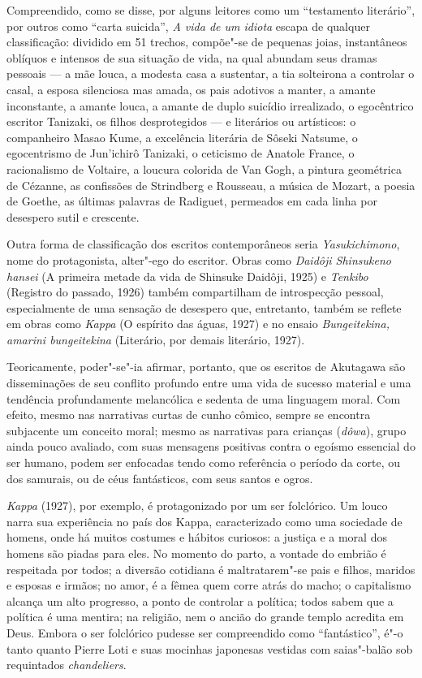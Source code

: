 Compreendido, como se disse, por alguns leitores como um ``testamento
literário'', por outros como ``carta suicida'', \textit{A vida de um idiota} 
escapa de qualquer classificação: dividido em 51 trechos, compõe"-se de
pequenas joias, instantâneos oblíquos e intensos de sua situação de
vida, na qual abundam seus dramas pessoais --- a mãe louca, a modesta casa
a sustentar, a tia solteirona a controlar o casal, a esposa silenciosa
mas amada, os pais adotivos a manter, a amante inconstante, a amante
louca, a amante de duplo suicídio irrealizado, o egocêntrico escritor
Tanizaki, os filhos desprotegidos --- e literários ou artísticos: o
companheiro Masao Kume, a excelência literária de Sôseki Natsume, o
egocentrismo de Jun'ichirô Tanizaki, o ceticismo de Anatole France, o
racionalismo de Voltaire, a loucura colorida de Van Gogh, a pintura
geométrica de Cézanne, as confissões de Strindberg e Rousseau, a música
de Mozart, a poesia de Goethe, as últimas palavras de Radiguet,
permeados em cada linha por desespero sutil e crescente.

Outra forma de classificação dos escritos contemporâneos seria
\textit{Yasukichimono}, nome do protagonista, alter"-ego do escritor. 
Obras como \textit{Daidôji Shinsukeno hansei} (A primeira metade da vida de 
Shinsuke Daidôji, 1925) e \textit{Tenkibo} (Registro do passado, 1926) também
compartilham de introspecção pessoal, especialmente de uma sensação de
desespero que, entretanto, também se reflete em obras como
\textit{Kappa}  (O espírito das águas, 1927) e no ensaio 
\textit{Bungeitekina, amarini bungeitekina} (Literário, por demais literário, 1927). 

Teoricamente, poder"-se"-ia afirmar, portanto, que os escritos de
Akutagawa são disseminações de seu conflito profundo entre uma vida de
sucesso material e uma tendência profundamente melancólica e
sedenta de uma linguagem moral. Com efeito, mesmo nas narrativas curtas
de cunho cômico, sempre se encontra subjacente um conceito moral; mesmo
as narrativas para crianças (\textit{dôwa}), grupo ainda pouco
avaliado, com suas mensagens positivas contra o egoísmo essencial do
ser humano, podem ser enfocadas tendo como referência o período da corte, ou dos
samurais, ou de céus fantásticos, com seus santos e ogros.

\textit{Kappa} (1927), por exemplo, é protagonizado por 
um ser folclórico. Um louco narra sua experiência no
país dos Kappa, caracterizado como uma sociedade de homens, onde há
muitos costumes e hábitos curiosos: a justiça e a moral dos homens são
piadas para eles. No momento do parto, a vontade do embrião é
respeitada por todos; a diversão cotidiana é maltratarem"-se pais e
filhos, maridos e esposas e irmãos; no amor, é a fêmea quem corre atrás
do macho; o capitalismo alcança um alto progresso, a ponto de controlar
a política; todos sabem que a política é uma mentira; na religião, nem
o ancião do grande templo acredita em Deus. Embora o ser folclórico
pudesse ser compreendido como ``fantástico'', é"-o tanto quanto Pierre
Loti e suas mocinhas japonesas vestidas com saias"-balão sob requintados
\textit{chandeliers}.

